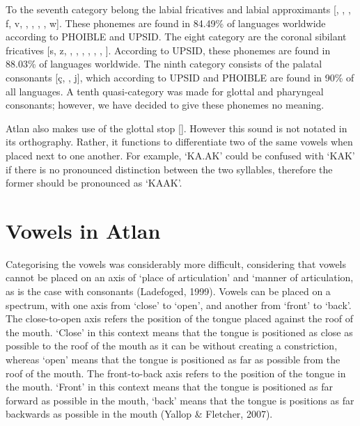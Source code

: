 To the seventh category belong the labial fricatives and labial approximants [, \textphi, \textbeta, f, v, \texttheta, \dh, \textscriptv , \textturnw, w]. These phonemes are found  in 84.49\% of languages worldwide according to PHOIBLE and UPSID. The eight category are the coronal sibilant fricatives [s, z, \textesh, \textyogh, \textrtails , \textrtailz, \textctc, \textctz,  \texththeng]. According to UPSID, these phonemes are found  in 88.03\% of languages worldwide. The ninth category consists of the palatal consonants [\c{c}, \textctj, j], which according to UPSID and PHOIBLE are found  in 90\% of all languages. A tenth quasi-category was made for glottal and pharyngeal consonants; however, we have decided to give these phonemes no meaning. 

Atlan also makes use of the glottal stop [\textglotstop]. However this sound is not notated in its orthography. Rather, it functions to differentiate two of the same vowels when placed next to one another. For example, ‘KA.AK’ could be confused with ‘KAK’ if there is no pronounced distinction between the two syllables, therefore the former should be pronounced as ‘KA\textglotstop AK’\footnotemark.  


\section{Vowels in Atlan}

Categorising the vowels was considerably more difficult, considering that vowels cannot be placed on an axis of ‘place of articulation’ and ‘manner of articulation, as is the case with consonants (Ladefoged, 1999). Vowels can be placed on a spectrum, with one axis from ‘close’ to ‘open’, and another from ‘front’ to ‘back’. The close-to-open axis refers the position of the tongue placed against the roof of the mouth. ‘Close’ in this context means that the tongue is positioned as close as possible to the roof of the mouth as it can be without creating a constriction, whereas ‘open’ means that the tongue is positioned as far as possible from the roof of the mouth. The front-to-back axis refers to the position of the tongue in the mouth. ‘Front’ in this context means that the tongue is positioned as far forward as possible in the mouth, ‘back’ means that the tongue is positions as far backwards as possible in the mouth (Yallop \& Fletcher, 2007). 

